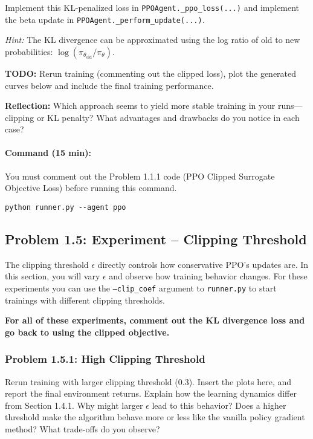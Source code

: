 \documentclass[12pt]{article}
\begin{document}
Implement this KL-penalized loss in \texttt{PPOAgent.\_ppo\_loss(...)} and implement the beta update in \texttt{PPOAgent.\_perform\_update(...)}.

\textit{Hint:} The KL divergence can be approximated using the log ratio of old to new probabilities: $\log(\pi_{\theta_{\text{old}}}/\pi_{\theta})$.

\noindent
\textbf{TODO:} Rerun training (commenting out the clipped loss), plot the generated curves below and include the final training performance.

\noindent
\textbf{Reflection:} Which approach seems to yield more stable training in your runs—clipping or KL penalty? What advantages and drawbacks do you notice in each case?

\paragraph{Command (15 min):}
You must comment out the Problem 1.1.1 code (PPO Clipped Surrogate Objective Loss) before running this command.
\begin{verbatim}
python runner.py --agent ppo
\end{verbatim}

\begin{solution}[height=5cm]
\end{solution}

\clearpage
\newpage

\subsection*{Problem 1.5: Experiment – Clipping Threshold}

The clipping threshold $\epsilon$ directly controls how conservative PPO’s updates are. In this section, you will vary $\epsilon$ and observe how training behavior changes. For these experiments you can use the \texttt{--clip\_coef} argument to \texttt{runner.py} to start trainings with different clipping thresholds.

\textbf{For all of these experiments, comment out the KL divergence loss and go back to using the clipped objective.}

\subsubsection*{Problem 1.5.1: High Clipping Threshold}
Rerun training with larger clipping threshold (0.3). Insert the plots here, and report the final environment returns.  Explain how the learning dynamics differ from Section 1.4.1. Why might larger $\epsilon$ lead to this behavior? Does a higher threshold make the algorithm behave more or less like the vanilla policy gradient method? What trade-offs do you observe?
\end{document}
